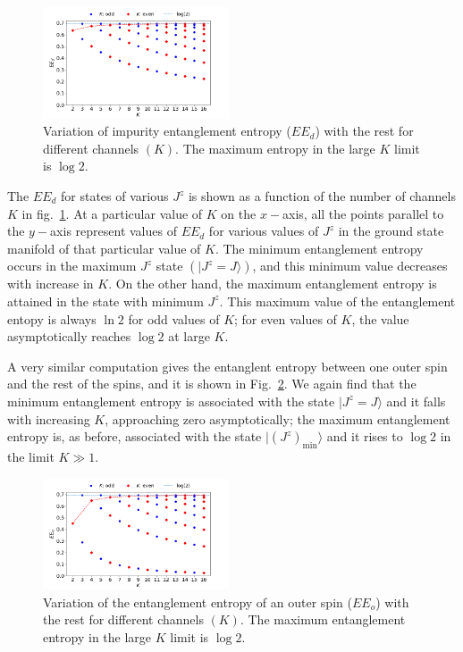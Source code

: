\documentclass[reprint,prb,superscriptaddress]{revtex4-2}
\begin{document}
\begin{figure}[!htpb]
\centering
\includegraphics[width=0.49\textwidth]{plt/EE_multi_channel_ANN.png}
\caption{Variation of impurity entanglement entropy ($EE_d$) with the rest for different channels $(K)$. The maximum entropy in the large $K$ limit is $\log 2$.}
\label{fig:EE_d}
\end{figure}
The \(EE_d\) for states of various \(J^z\) is shown as a function of the number of channels \(K\) in fig.~\ref{fig:EE_d}. At a particular value of \(K\) on the \(x-\)axis, all the points parallel to the \(y-\)axis represent values of \(EE_d\) for various values of \(J^z\) in the ground state manifold of that particular value of \(K\). The minimum entanglement entropy occurs in the maximum \(J^z\) state $\left(|J^z=J\rangle\right)$, and this minimum value decreases with increase in \(K\). On the other hand, the maximum entanglement entropy is attained in the state with minimum \(J^z\). This maximum value of the entanglement entopy is always \(\ln 2\) for odd values of \(K\); for even values of \(K\), the value asymptotically reaches $\log 2$ at large \(K\). 

A very similar computation gives the entanglent entropy between one outer spin and the rest of the spins, and it is shown in Fig.~\ref{fig:EE_outer}.
We again find that the minimum entanglement entropy is associated with the state $|J^z=J\rangle$ and it falls with increasing \(K\), approaching zero asymptotically; the maximum entanglement entropy is, as before, associated with the state $|\left(J^z\right)_\mathrm{min}\rangle$ and it rises to $\log 2$ in the limit $K\gg 1$.
\begin{figure}[!htpb]
\centering
\includegraphics[width=0.49\textwidth]{plt/outer_EE_multi_channel_ANN.png}
\caption{Variation of the entanglement entropy of an outer spin ($EE_o$) with the rest for different channels $(K)$. The maximum entanglement entropy in the large $K$ limit is $\log 2$.}
\label{fig:EE_outer}
\end{figure}
\end{document}
